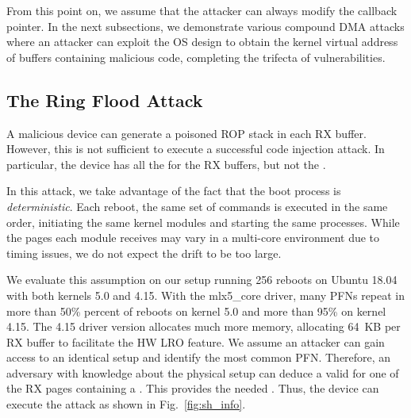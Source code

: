 

From this point on, we assume that the attacker can always modify the callback pointer. In the next subsections, we demonstrate various compound DMA attacks where an attacker can exploit the OS design to obtain the kernel virtual address of buffers containing malicious code, completing the trifecta of vulnerabilities.

\subsection{The Ring Flood \Compound{} Attack}\label{sec:ringflod}
A malicious device can generate a poisoned ROP stack in each RX buffer.
However, this is not sufficient to execute a successful code injection attack. 
In particular, the device has all the \iova{} for the RX buffers, but not the \kva{}.


In this attack, we take advantage of the fact that the boot process is \emph{deterministic}. Each reboot, the same set of commands is executed in the same order, initiating the same kernel modules and starting the same processes. While the pages each module receives may vary in a multi-core environment due to timing issues, we do not expect the drift to be too large. 

We evaluate this assumption on our setup running 256 reboots on Ubuntu 18.04 with both kernels 5.0 and 4.15. With the mlx5\_core driver, many PFNs repeat in more than 50\% percent of reboots on kernel 5.0 and more than 95\% on kernel 4.15. The 4.15 driver version allocates much more memory, allocating 64~KB per RX buffer to facilitate the HW LRO feature. We assume an attacker can gain access to an identical setup and identify the most common PFN. Therefore, an adversary with knowledge about the physical setup can deduce a valid \kva{} for one of the RX pages containing a \mabaf. This provides the needed \kva. Thus, the device can execute the attack as shown in Fig.~\ref{fig:sh_info}.

